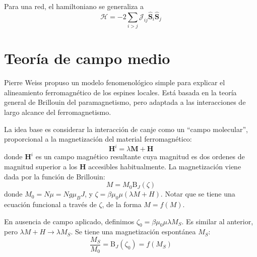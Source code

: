 \documentclass{tufte-book}
\newcommand{\Ham}{\mathscr{H}}
\newcommand{\sub}[1]{_{{\scriptscriptstyle\mathit{#1}}}}
\newcommand{\mb}{μ\sub{B}}
\begin{document}
Para una red, el hamiltoniano se generaliza a
\begin{equation}
  \Ham = - 2 \sum_{i>j} \mathcal{J}_{ij} \hat{\symbf{S}}_i\hat{\symbf{S}}_j
\end{equation}

%
%
%
%
%


\section{Teoría de campo medio}
\label{sec:meanfield}
Pierre Weiss propuso un modelo fenomenológico simple para explicar el
alineamiento ferromagnético de los espines locales. Está basada en la
teoría general de Brillouin del paramagnetismo, pero adaptada a las
interacciones de largo alcance del ferromagnetismo.

La idea base es considerar la interacción de canje como un ``campo
molecular'', proporcional a la magnetización del material ferromagnético:
\begin{equation}
  \symbf{H}^i = λ \symbf{M} + \symbf{H}
\end{equation}
donde $\symbf{H}^i$ es un campo magnético resultante cuya magnitud es
dos ordenes de magnitud superior a los $\symbf{H}$ accesibles habitualmente.
La magnetización viene dada por la función de Brillouin:
\begin{equation}
  M = M_0 \text{B}_J(ζ)
\end{equation}
donde $M_0 = Nμ = Ng\mb J$, y $ζ = βμ_0μ(λM+H)$.
Notar que se tiene una ecuación funcional a través de $ζ$, de la forma
$M = f(M)$.

En ausencia de campo aplicado, definimos $ζ_0=βμ_0μλM\sub{S}$. Es
similar al anterior, pero $λM+H → λM\sub{S}$. Se tiene una
magnetización espontánea $M\sub{S}$:
\begin{equation}
  \boxed{
    \frac{M\sub{S}}{M_0} =\text{B}_J(ζ_0) = f(M\sub{S})
  }
  \label{eq:brill}
\end{equation}
\end{document}
